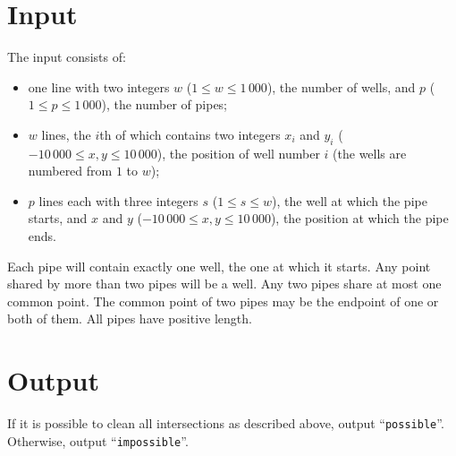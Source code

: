 \section*{Input}

The input consists of:
\begin{itemize}
\item one line with two integers $w$ ($1 \le w \le 1\,000$), the number of wells, and $p$ ($1 \le p \le 1\,000$), the number of pipes;
\item $w$ lines, the $i$th of which contains two integers $x_i$ and $y_i$ ($-10\,000 \le x, y \le 10\,000$), the position of well number $i$ (the wells are numbered from $1$ to $w$);
\item $p$ lines each with three integers $s$ ($1 \le s \leq w$), the well at which the pipe starts, and $x$ and $y$ ($-10\,000 \le x, y \le 10\,000$), the position at which the pipe ends.
\end{itemize}
Each pipe will contain exactly one well, the one at which it starts.
Any point shared by more than two pipes will be a well.
Any two pipes share at most one common point. The common point of two
pipes may be the endpoint of one or both of them.
All pipes have positive length.

\section*{Output}
If it is possible to clean all intersections as described above, output ``\texttt{possible}''. Otherwise, output ``\texttt{impossible}''.
